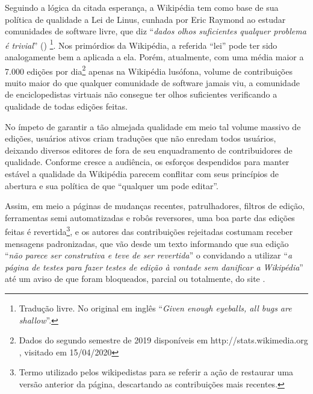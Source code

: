 Seguindo a lógica da citada esperança, a Wikipédia tem como base de sua política de qualidade a Lei de Linus, cunhada por Eric Raymond ao estudar comunidades de software livre, que diz ``\textit{dados olhos suficientes qualquer problema é trivial}'' (\citeyear{raymond_cathedral_1999}) \footnote{Tradução livre. No original em inglês ``\textit{Given enough eyeballs, all bugs are shallow}''.}. Nos primórdios da Wikipédia, a referida ``lei'' pode ter sido analogamente bem a aplicada a ela. Porém, atualmente, com uma média maior a 7.000 edições por dia\footnote{Dados do segundo semestre de 2019 disponíveis em http://stats.wikimedia.org , visitado em 15/04/2020} apenas na Wikipédia lusófona, volume de contribuições muito maior do que qualquer comunidade de software jamais viu, a comunidade de enciclopedistas virtuais não consegue ter olhos suficientes verificando a qualidade de todas edições feitas. 

No ímpeto de garantir a tão almejada qualidade em meio tal volume massivo de edições, usuários ativos criam traduções que não enredam todos usuários, deixando diversos editores de fora de seu enquadramento de contribuidores de qualidade. Conforme cresce a audiência, os esforços despendidos para manter estável a qualidade da Wikipédia parecem conflitar com seus princípios de abertura e sua política de que ``qualquer um pode editar''.

Assim, em meio a páginas de mudanças recentes, patrulhadores, filtros de edição, ferramentas semi automatizadas e robôs reversores, uma boa parte das edições feitas é revertida\footnote{Termo utilizado pelos wikipedistas para se referir a ação de restaurar uma versão anterior da página, descartando as contribuições mais recentes.}, e os autores das contribuições rejeitadas costumam receber mensagens padronizadas,  que vão desde um texto informando que sua edição ``\textit{não parece ser construtiva e teve de ser revertida}'' o convidando a utilizar ``\textit{a página de testes para fazer testes de edição à vontade sem danificar a Wikipédia}''  até um aviso de que foram bloqueados, parcial ou totalmente, do site .


